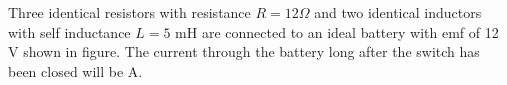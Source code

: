 \item Three identical resistors with resistance \( R = 12 \Omega \) and two identical inductors with self inductance \( L = 5 \text{ mH} \) are connected to an ideal battery with emf of 12 V shown in figure. The current through the battery long after the switch has been closed will be \underline{\hspace{2.5cm}} A.
    \begin{center}
    \end{center}